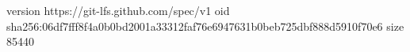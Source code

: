 version https://git-lfs.github.com/spec/v1
oid sha256:06df7fff8f4a0b0bd2001a33312faf76e6947631b0beb725dbf888d5910f70e6
size 85440
